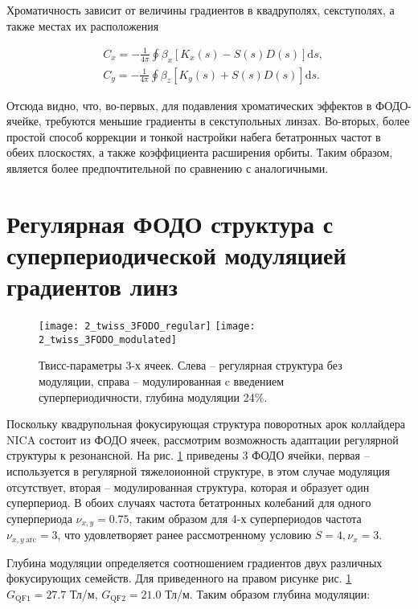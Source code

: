 \noindent Хроматичность зависит от величины градиентов в квадруполях, секступолях, а также местах их расположения \cite{lee}

\begin{equation}
\begin{aligned}
& C_x=-\frac{1}{4 \pi} \oint \beta_x\left[K_x(s)-S(s) D(s)\right] \textrm{d} s, \\
& C_y=-\frac{1}{4 \pi} \oint \beta_z\left[K_y(s)+S(s) D(s)\right] \textrm{d} s.
\end{aligned}
\end{equation}

\noindent Отсюда видно, что, во-первых, для подавления хроматических эффектов в ФОДО-ячейке, требуются меньшие градиенты в секступольных линзах. Во-вторых, более простой способ коррекции и тонкой настройки набега бетатронных частот в обеих плоскостях, а также коэффициента расширения орбиты. Таким образом, является более предпочтительной по сравнению с аналогичными.

	\section{Регулярная ФОДО структура с суперпериодической модуляцией градиентов линз}\label{sec:transition_variation/methods/FODO}

\begin{figure}
   \texttt{[image: 2\_twiss\_3FODO\_regular]}
   \texttt{[image: 2\_twiss\_3FODO\_modulated]}
   \caption{Твисс-параметры 3-х ячеек. Слева – регулярная структура без модуляции, справа – модулированная c введением суперпериодичности, глубина модуляции 24\%.}
   \label{fig:twiss_3FODO}
\end{figure}

\par Поскольку квадрупольная фокусирующая структура поворотных арок коллайдера NICA состоит из ФОДО ячеек, рассмотрим возможность адаптации регулярной структуры к резонансной. На рис. \ref{fig:twiss_3FODO} приведены 3 ФОДО ячейки, первая – используется в регулярной тяжелоионной структуре, в этом случае модуляция отсутствует, вторая – модулированная структура,  которая и образует один суперпериод. В обоих случаях частота бетатронных колебаний для одного суперпериода $\nu_{x,y}=0.75$, таким образом для 4-х суперпериодов частота $\nu_{x,y\ \text{arc}}=3$, что удовлетворяет ранее рассмотренному условию $S=4, \nu_x=3$.

Глубина модуляции определяется соотношением градиентов двух различных фокусирующих семейств. Для приведенного на правом рисунке рис. \ref{fig:twiss_3FODO} $G_{\textrm{QF1}}=27.7$ Тл/м, $G_{\textrm{QF2}}=21.0$ Тл/м. Таким образом глубина модуляции:

